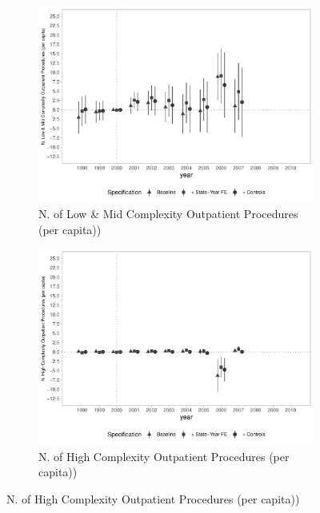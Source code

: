 \begin{figure}[h]
\begin{center}
\begin{subfigure}{0.32\textwidth}
    \end{subfigure}
    \begin{subfigure}{0.32\textwidth}
        \centering
        \caption{\scriptsize N. of Low & Mid Complexity Outpatient Procedures (per capita))}\label{fig:amb_c}
        \includegraphics[width=\textwidth]{plots/ambulatorial/sia_nprod_amb_lc_mun_pcapita_dist_ec29_baseline_dist_ec29_baseline_full.pdf}
    \end{subfigure}
    \begin{subfigure}{0.32\textwidth}
        \centering
        \caption{\scriptsize N. of High Complexity Outpatient Procedures (per capita))}\label{fig:amb_d}
        \includegraphics[width=\textwidth]{plots/ambulatorial/sia_nprod_amb_hc_mun_pcapita_dist_ec29_baseline_dist_ec29_baseline_full.pdf}
    \end{subfigure}

\end{center}
\end{figure}
